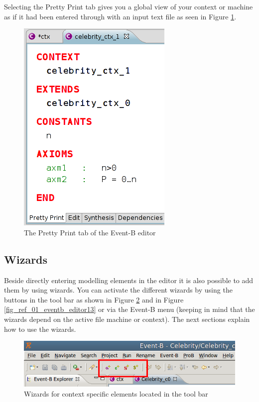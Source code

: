 Selecting the \textsf{Pretty Print} tab gives you a global view of your context or machine as if it had been entered through with an input text file as seen in Figure \ref{fig_ref_01_eventb_editor10}.

\begin{figure}[!ht]
\begin{center}
	\includegraphics{img/reference/ref_01_eventb_editor10.png}
	\caption{The Pretty Print tab of the Event-B editor}
	\label{fig_ref_01_eventb_editor10}
\end{center}
\end{figure}


\subsection{Wizards}
\label{eventb_wizards}
Beside directly entering modelling elements in the editor it is also possible to add them by using wizards.
You can activate the different wizards by using the buttons in the tool bar as shown in Figure \ref{fig_ref_01_eventb_editor12} and in Figure \ref{fig_ref_01_eventb_editor13} or via the Event-B menu (keeping in mind that the wizards depend on the active file machine or context). The next sections explain how to use the wizards.

\begin{figure}[!ht]
\begin{center}
	\includegraphics{img/reference/ref_01_eventb_editor12.png}
	\caption{Wizards for context specific elements located in the tool bar}
	\label{fig_ref_01_eventb_editor12}
\end{center}
\end{figure}

